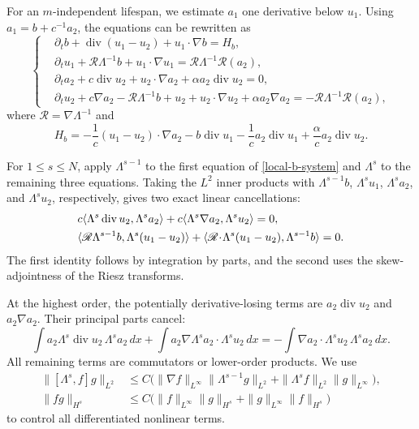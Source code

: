 \documentclass[10pt,reqno]{amsart}
\numberwithin{equation}{section}
\begin{document}
For an $m$-independent lifespan, we estimate $a_1$ one derivative below $u_1$. Using $a_1=b+c^{-1}a_2$, the equations can be rewritten as
\begin{equation}\label{local-b-system}
\left\{
\begin{aligned}
&\partial_tb+\operatorname{div}(u_1-u_2)  +u_1\cdot\nabla b=H_b,\\
&\partial_tu_1+\mathscr R\Lambda^{-1}b  +u_1\cdot\nabla u_1  =\mathscr R\Lambda^{-1}\mathcal R(a_2),\\
&\partial_ta_2+c\operatorname{div}u_2  +u_2\cdot\nabla a_2  +\alpha a_2\operatorname{div}u_2=0,\\
&\partial_tu_2+c\nabla a_2-\mathscr R\Lambda^{-1}b+u_2  +u_2\cdot\nabla u_2+\alpha a_2\nabla a_2  =-\mathscr R\Lambda^{-1}\mathcal R(a_2),
\end{aligned}
\right.
\end{equation}
where $\mathscr R=\nabla\Lambda^{-1}$ and
\[%
H_b= -\frac1c(u_1-u_2)\cdot\nabla a_2 -b\operatorname{div}u_1 -\frac1c a_2\operatorname{div}u_1 +\frac{\alpha}{c}a_2\operatorname{div}u_2.
\]%

For $1\le s\le N$, apply $\Lambda^{s-1}$ to the first equation of
\eqref{local-b-system} and $\Lambda^s$ to the remaining three
equations. Taking the $L^2$ inner products with
$\Lambda^{s-1}b$, $\Lambda^su_1$, $\Lambda^sa_2$, and
$\Lambda^su_2$, respectively, gives two exact linear cancellations:
\begin{align*}%
&c\langle\Lambda^s\operatorname{div}u_2,\Lambda^sa_2\rangle +c\langle\Lambda^s\nabla a_2,\Lambda^su_2\rangle=0,\notag\\
&\langle\mathscr R\Lambda^{s-1}b,  \Lambda^s(u_1-u_2)\rangle +\langle\mathscr R\!\cdot\!\Lambda^s(u_1-u_2),  \Lambda^{s-1}b\rangle=0.
\end{align*}
The first identity follows by integration by parts, and the second uses the skew-adjointness of the Riesz transforms.

At the highest order, the potentially derivative-losing terms are $a_2\operatorname{div}u_2$ and $a_2\nabla a_2$. Their principal parts cancel:
\[%
 \int a_2\Lambda^s\operatorname{div}u_2\,\Lambda^sa_2\,dx +\int a_2\nabla\Lambda^sa_2\cdot\Lambda^su_2\,dx  =-\int\nabla a_2\cdot\Lambda^su_2\,\Lambda^sa_2\,dx.
\]%
All remaining terms are commutators or lower-order products. We use
\begin{align*}
\|[\Lambda^s,f]g\|_{L^2} &\le C\bigl( \|\nabla f\|_{L^\infty}\|\Lambda^{s-1}g\|_{L^2} +\|\Lambda^sf\|_{L^2}\|g\|_{L^\infty} \bigr),\\
\|fg\|_{H^s} &\le C\bigl( \|f\|_{L^\infty}\|g\|_{H^s} +\|g\|_{L^\infty}\|f\|_{H^s} \bigr)
\end{align*}
to control all differentiated nonlinear terms.
\end{document}
